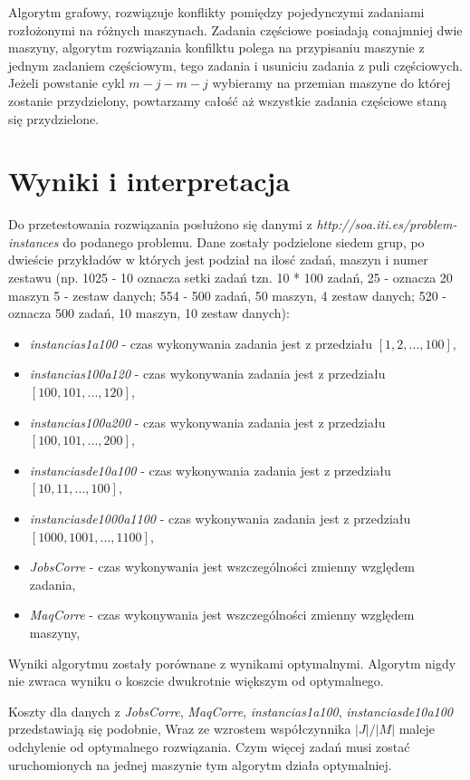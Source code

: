 Algorytm grafowy, rozwiązuje konflikty pomiędzy pojedynczymi zadaniami rozłożonymi na różnych maszynach.
Zadania częściowe posiadają conajmniej dwie maszyny, algorytm rozwiązania konfilktu polega na 
przypisaniu maszynie z jednym zadaniem częściowym, tego zadania i usuniciu zadania z puli częściowych.
Jeżeli powstanie cykl $m-j-m-j$ wybieramy na przemian maszyne do której zostanie przydzielony, 
powtarzamy całość aż wszystkie zadania częściowe staną się przydzielone. 

\section{Wyniki i interpretacja}

Do przetestowania rozwiązania posłużono się danymi z \textit{http://soa.iti.es/problem-instances} do podanego problemu.
Dane zostały podzielone siedem grup, po dwieście przykładów w których jest podział na ilosć
zadań, maszyn i numer zestawu (np. 1025 - 10 oznacza setki zadań tzn. 10 * 100 zadań, 25 - oznacza 20 maszyn 5 - 
 zestaw danych; 554 - 500 zadań, 50 maszyn, 4 zestaw danych; 520 - oznacza 500 zadań, 10 maszyn, 10 zestaw danych):
\begin{itemize}
    \item \textit{instancias1a100} - czas wykonywania zadania jest z przedziału $[1,2,...,100]$,
    \item \textit{instancias100a120} - czas wykonywania zadania jest z przedziału $[100,101,...,120]$,
    \item \textit{instancias100a200} - czas wykonywania zadania jest z przedziału $[100,101,...,200]$,
    \item \textit{instanciasde10a100} - czas wykonywania zadania jest z przedziału $[10,11,...,100]$,
    \item \textit{instanciasde1000a1100} - czas wykonywania zadania jest z przedziału $[1000,1001,...,1100]$,
    \item \textit{JobsCorre} - czas wykonywania jest wszczególności zmienny względem zadania,
    \item \textit{MaqCorre} - czas wykonywania jest wszczególności zmienny względem maszyny,
\end{itemize}
Wyniki algorytmu zostały porównane z wynikami optymalnymi. Algorytm nigdy nie zwraca wyniku o koszcie dwukrotnie większym od optymalnego. 

Koszty dla danych z \textit{JobsCorre}, \textit{MaqCorre}, \textit{instancias1a100}, \textit{instanciasde10a100} przedstawiają się podobnie, 
Wraz ze wzrostem współczynnika $|J|/|M|$ maleje odchylenie od optymalnego rozwiązania. Czym więcej
zadań musi zostać uruchomionych na jednej maszynie tym algorytm działa optymalniej. 

